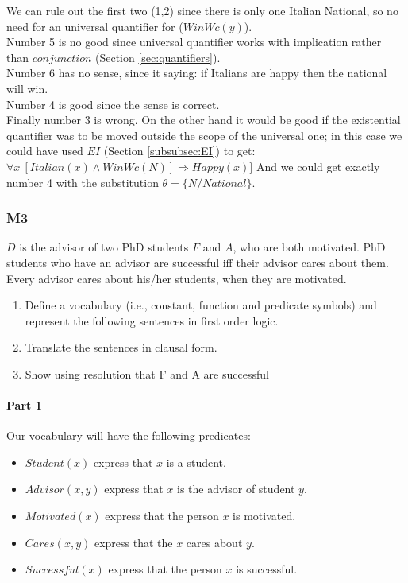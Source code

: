 \documentclass[10pt,a4paper]{article}
\begin{document}
\begin{itemize}
We can rule out the first two (1,2) since there is only one Italian National, so no need for an universal quantifier for ($WinWc(y)$).\\
Number 5 is no good since universal quantifier works with implication rather than $conjunction$ (Section \ref{sec:quantifiers}).\\
Number 6 has no sense, since it saying: if Italians are happy then the national will win.\\
Number 4 is good since the sense is correct.\\
Finally number 3 is wrong. On the other hand it would be good  if the existential quantifier was to be moved outside the scope of the universal one; in this case we could have used $EI$ (Section \ref{subsubsec:EI}) to get:
$\forall x\ [Italian(x)\wedge WinWc(N)]\Rightarrow Happy(x)]$
And we could get exactly number 4 with the substitution $\theta=\{N/National\}$.

\subsubsection{M3}
$D$ is the advisor of two PhD students $F$ and $A$, who are both motivated. PhD students who have an advisor are successful iff their advisor cares about them. Every advisor cares about his/her students, when they are motivated.
\begin{enumerate}
\item Define a vocabulary (i.e., constant, function and predicate symbols) and represent the following sentences in first order logic.
\item Translate the sentences in clausal form.
\item Show using resolution that F and A are successful
\end{enumerate}


\paragraph{Part 1}

Our vocabulary will have the following predicates:
\begin{itemize}
\item $Student(x)$ express that $x$ is a student.
\item $Advisor(x,y)$ express that $x$ is the advisor of student $y$.
\item $Motivated(x)$ express that the person $x$ is motivated.
\item $Cares(x,y)$ express that the  $x$ cares about $y$.
\item $Successful(x)$ express that the person $x$ is successful.
\end{itemize}



\end{itemize}
\end{document}
